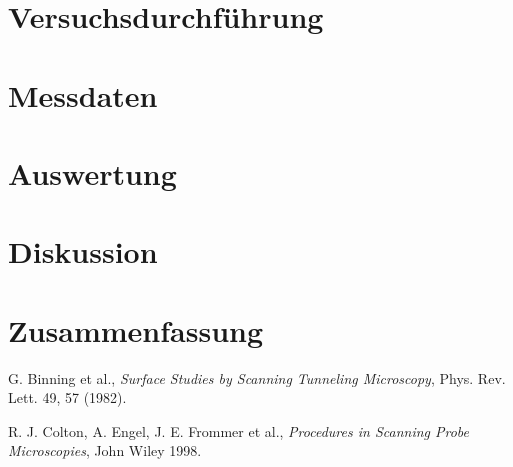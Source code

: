 \documentclass[10pt, a4paper]{article}
\begin{document}
\section{Versuchsdurchführung}

\section{Messdaten}

\section{Auswertung}

\section{Diskussion}

\section{Zusammenfassung}


\begin{thebibliography}{9}

  G. Binning et al.,
  \emph{Surface Studies by Scanning Tunneling Microscopy},
  Phys. Rev. Lett. 49, 57 (1982).

  R. J. Colton, A. Engel, J. E. Frommer et al.,
  \emph{Procedures in Scanning Probe Microscopies},
  John Wiley 1998.
  
\end{thebibliography}
\end{document}

